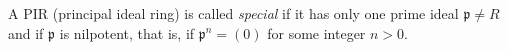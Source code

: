 A PIR (principal ideal ring) is called \textit{special} if it has only one prime ideal $\mathfrak{p} \neq R$ and if $\mathfrak{p}$ is nilpotent, that is, if $\mathfrak{p}^n = (0)$ for some integer $n > 0$.
